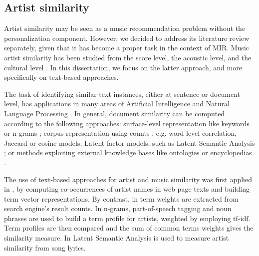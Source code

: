 \subsection{Artist similarity}
\label{sec:SOA:mir:similarity}

Artist similarity may be seen as a music recommendation problem without the personalization component. However, we decided to address its literature review separately, given that it has become a proper task in the context of MIR.
Music artist similarity has been studied from the score level, the acoustic level, and the cultural level \citep{Ellis2002}. In this dissertation, we focus on the latter approach, and more specifically on text-based approaches. %

The task of identifying similar text instances, either at sentence or document level, has applications in many areas of Artificial Intelligence and Natural Language Processing \citep{LiuandWang2014}. In general, document similarity can be computed according to the following approaches: surface-level representation like keywords or n-grams \citep{ChimandDeng2008}; corpus representation using counts \citep{Rorvig1999}, e.g. word-level correlation, Jaccard or cosine models; Latent factor models, such as Latent Semantic Analysis \citep{Deerwesteretal1990}; or methods exploiting external knowledge bases like ontologies or encyclopedias \citep{Huetal2009}.

The use of text-based approaches for artist and music similarity was first applied in \citep{Cohen2000}, by computing co-occurrences of artist names in web page texts and building term vector representations. By contrast, in \citep{Schedl2005} term weights are extracted from search engine's result counts. In \citep{Whitman2002} n-grams, part-of-speech tagging and noun phrases are used to build a term profile for artists, weighted by employing tf-idf. Term profiles are then compared and the sum of common terms weights gives the similarity measure. %
In \citep{Logan2003} Latent Semantic Analysis is used to measure artist similarity from song lyrics. %


